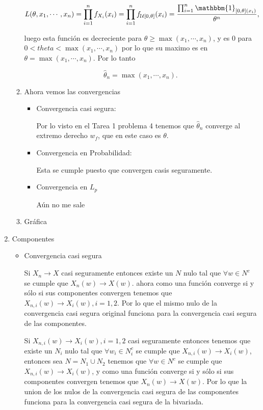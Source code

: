 \documentclass[letterpaper]{article}
\newcommand{\1}{\mathbbm{1}}
\begin{document}
\begin{enumerate}
\begin{enumerate}
			\[L(\theta, x_1, \cdots, x_n) = \prod_{i=1}^n f_{X_i}(x_i) = \prod_{i=1}^n f_{\mathcal{U}[0,\theta]}(x_i) = \frac{\prod_{i=1}^n \mathbbm{1}_{[0,\theta](x_i)}}{\theta^n},\]

			luego esta función es decreciente para $\theta \geq \max(x_1,\cdots,x_n)$, y es $0$ para $0 < theta < \max(x_1,\cdots,x_n)$ por lo que su maximo es en $\theta = \max(x_1,\cdots,x_n)$. Por lo tanto

			\[\hat{\theta}_n = \max(x_1,\cdots,x_n).\]

			\item Ahora vemos las convergencias
			
			\begin{itemize}
				\item Convergencia casi segura:
				
				Por lo visto en el Tarea 1 problema 4 tenemos que $\hat{\theta}_n$ converge al extremo derecho $w_f$, que en este caso es $\theta$.

				\item Convergencia en Probabilidad:
				
				Esta se cumple puesto que convergen casis seguramente.

				\item Convergencia en $L_p$
				
				Aún no me sale
			\end{itemize}

			\item Gráfica

		\end{enumerate}

		\item Componentes
		
		\begin{itemize}
			\item Convergencia casi segura
			
			Si $X_n \rightarrow X$ casi seguramente entonces existe un $N$ nulo tal que $\forall w \in N^c$ se cumple que $X_n(w) \rightarrow X(w)$. ahora como una función converge si y sólo si sus componentes convergen tenemos que $X_{n,i}(w) \rightarrow X_i(w), i = {1,2}$. Por lo que el mismo nulo de la convergencia casi segura original funciona para la convergencia casi segura de las componentes.

			Si $X_{n,i}(w) \rightarrow X_i(w), i = {1,2}$ casi seguramente entonces tenemos que existe un $N_i$ nulo tal que $\forall w_i \in N_i^c$ se cumple que $X_{n,i}(w) \rightarrow X_i(w)$, entonces sea $N = N_1 \cup N_2$ tenemos que $\forall w \in N^c$ se cumple que $X_{n,i}(w) \rightarrow X_i(w)$, y como una función converge si y sólo si sus componentes convergen tenemos que $X_n(w) \rightarrow X(w)$. Por lo que la union de los nulos de la convergencia casi segura de las componentes funciona para la convergencia casi segura de la bivariada.


\end{itemize}
\end{enumerate}
\end{document}
